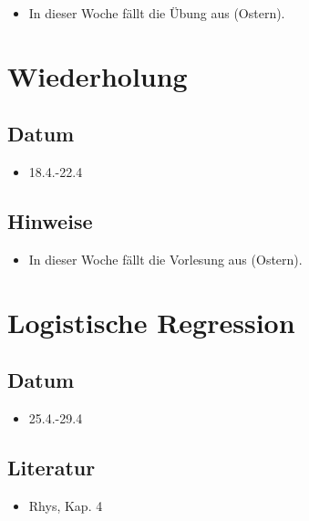\documentclass[
]{book}
\providecommand{\tightlist}{%
  \setlength{\itemsep}{0pt}\setlength{\parskip}{0pt}}
\begin{document}
\begin{itemize}
\tightlist
\item
  In dieser Woche fällt die Übung aus (Ostern).
\end{itemize}

\hypertarget{wiederholung}{%
\section{Wiederholung}\label{wiederholung}}

\hypertarget{datum-5}{%
\subsection{Datum}\label{datum-5}}

\begin{itemize}
\tightlist
\item
  18.4.-22.4
\end{itemize}

\hypertarget{hinweise-2}{%
\subsection{Hinweise}\label{hinweise-2}}

\begin{itemize}
\tightlist
\item
  In dieser Woche fällt die Vorlesung aus (Ostern).
\end{itemize}

\hypertarget{logistische-regression}{%
\section{Logistische Regression}\label{logistische-regression}}

\hypertarget{datum-6}{%
\subsection{Datum}\label{datum-6}}

\begin{itemize}
\tightlist
\item
  25.4.-29.4
\end{itemize}

\hypertarget{literatur-6}{%
\subsection{Literatur}\label{literatur-6}}

\begin{itemize}
\tightlist
\item
  Rhys, Kap. 4
\end{itemize}
\end{document}
